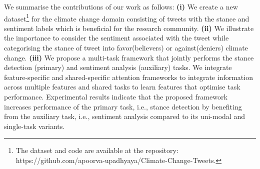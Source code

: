\documentclass[letterpaper]{article} %
\begin{document}
\par\noindent We summarise the contributions of our work as follows:
\textbf{(i)} We create a new dataset\footnote{The dataset and code are available at the repository:  https://github.com/apoorva-upadhyaya/Climate-Change-Tweets.} for the climate change domain consisting of tweets with the stance and sentiment labels which is beneficial for the research community. \textbf{(ii)} We illustrate the importance to consider the sentiment associated with the tweet while categorising the stance of tweet into favor(believers) or against(deniers) climate change. \textbf{(iii)} We propose a multi-task framework that jointly performs the stance detection (primary) and sentiment analysis (auxiliary) tasks. We integrate feature-specific and shared-specific attention frameworks to integrate information across multiple features and shared tasks to learn features that optimise task performance. Experimental results indicate that the proposed framework increases performance of the primary task, i.e., stance detection by benefiting from the auxiliary task, i.e., sentiment analysis compared to its uni-modal and single-task variants.
\end{document}
